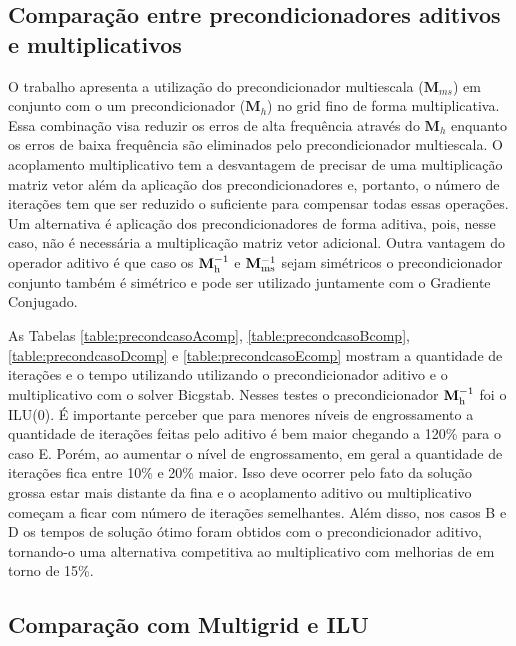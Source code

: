 \subsection{Comparação entre precondicionadores aditivos e multiplicativos}

O trabalho \cite{casteletto} apresenta a utilização do precondicionador multiescala ($\mathbf{M}_{ms}$) em conjunto com o um precondicionador ($\mathbf{M}_h$) no grid fino de forma multiplicativa. 
Essa combinação visa reduzir os erros de alta frequência através do $\mathbf{M}_h$ enquanto os erros de baixa frequência são eliminados pelo precondicionador multiescala. 
O acoplamento multiplicativo tem a desvantagem de precisar de uma multiplicação matriz vetor além da aplicação dos precondicionadores
e, portanto, o número de iterações tem que ser reduzido o suficiente para compensar todas essas operações. Um alternativa é aplicação
dos precondicionadores de forma aditiva, pois, nesse caso, não é necessária a multiplicação matriz vetor adicional. Outra vantagem do operador aditivo é que caso os $\mathbf{M}^{-1}_{\text{h}}$ e $\mathbf{M}^{-1}_{\text{ms}}$ sejam simétricos o precondicionador conjunto também é simétrico e pode ser utilizado juntamente com o Gradiente Conjugado.


As Tabelas \ref{table:precondcasoAcomp}, \ref{table:precondcasoBcomp}, \ref{table:precondcasoDcomp} e \ref{table:precondcasoEcomp} mostram a quantidade de iterações e o tempo utilizando utilizando o precondicionador aditivo e o multiplicativo com o solver Bicgstab. Nesses testes o precondicionador $\mathbf{M}^{-1}_{\text{h}}$ foi o ILU(0). É importante perceber que para menores níveis de engrossamento a quantidade de iterações feitas pelo aditivo é bem maior chegando a 120\% para o caso E. Porém, ao aumentar o nível de engrossamento, em geral a quantidade de iterações fica entre 10\% e 20\% maior. Isso deve ocorrer pelo fato da solução grossa estar mais distante da fina e o acoplamento aditivo ou multiplicativo começam a ficar com número de iterações semelhantes. Além disso, nos casos B e D os tempos de solução ótimo foram obtidos com o precondicionador aditivo, tornando-o uma alternativa competitiva ao multiplicativo com melhorias de em torno de 15\%.







\subsection{Comparação com Multigrid e ILU}

